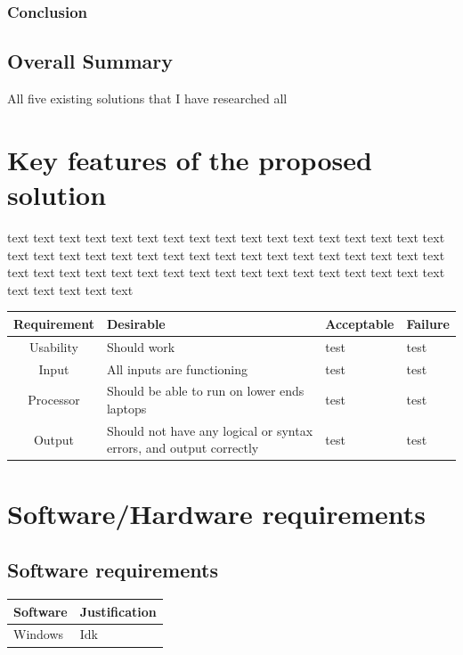 \documentclass[11pt,a4paper]{report}
\begin{document}
\subsubsection{Conclusion}


\subsection{Overall Summary}

All five existing solutions that I have researched all



\section{Key features of the proposed solution}

text text text text text text text text text text text text text text text text text text text text text text text text text text text text text text text text text text text text text text text text text text text text text text text text text text text text text text text text

\begin{center}
\begin{tabular}{ | c | m{11em} | m{11em} | m{11em} | }
\hline
 \textbf{Requirement} & \textbf{Desirable} & \textbf{Acceptable} & \textbf{Failure} \\
\hline
Usability & Should work & test & test \\
\hline
Input & All inputs are functioning & test & test \\
\hline
Processor & Should be able to run on lower ends laptops & test & test  \\
\hline
Output & Should not have any logical or syntax errors, and output correctly & test & test  \\
\hline
\end{tabular}
\end{center}






\section{Software/Hardware requirements}

\subsection{Software requirements}
\begin{tabular}{|m{4.5em}|m{35em}|}
    \hline
    Software & Justification \\
    \hline
    Windows & Idk \\
    \hline
\end{tabular}
\end{document}
